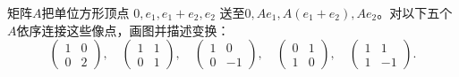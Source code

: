 \begin{exercise}\label{cw:rec21-2}
矩阵$A$把单位方形顶点 $0,e_1,e_1+e_2,e_2$ 送至$0,Ae_1,A(e_1+e_2),Ae_2$。对以下五个$A$依序连接这些像点，画图并描述变换：
\[\begin{pmatrix}1&0\\0&2\end{pmatrix},\quad\begin{pmatrix}1&1\\0&1\end{pmatrix},\quad\begin{pmatrix}1&0\\0&-1\end{pmatrix},\quad\begin{pmatrix}0&1\\1&0\end{pmatrix},\quad\begin{pmatrix}1&1\\1&-1\end{pmatrix}.\]
\end{exercise}
